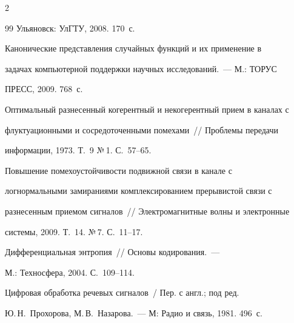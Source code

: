 \begin{multicols}{2}
{{\begin{thebibliography}{99}
Ульяновск: УлГТУ, 2008. 170~с.









Канонические представления случайных функций и их применение в 


задачах компьютерной поддержки научных исследований.~--- М.: ТОРУС 


ПРЕСС, 2009. 768~с.









Оптимальный разнесенный когерентный и некогерентный прием в каналах с 


флуктуационными и сосредоточенными помехами~// Проблемы передачи 


информации, 1973. Т.~9 №\,1. С.~57--65.









Повышение помехоустойчивости подвижной связи в канале с 


логнормальными замираниями комплексированием прерывистой связи с 


разнесенным приемом сигналов~// Электромагнитные волны и электронные 


системы, 2009. Т.~14. №\,7. С.~11--17.







 Дифференциальная энтропия~// Основы кодирования.~--- 


М.: Техносфера, 2004. С.~109--114.









Цифровая обработка речевых сигналов~/ Пер. с англ.; под ред. 


Ю.\,Н.~Прохорова, М.\,В.~Назарова.~--- М: Радио и связь, 1981. 496~с. 





 \label{end\stat}






\end{thebibliography}}}
\end{multicols}
